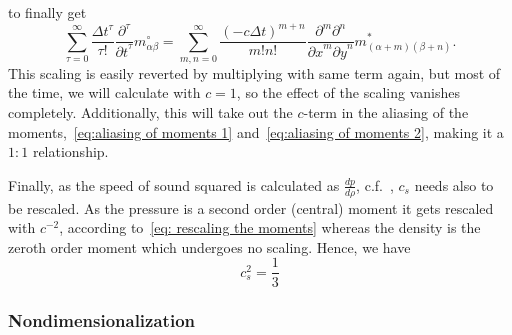 to finally get
\begin{equation}
  \label{eq: Taylor of moments}
  \sum_{\tau = 0}^\infty \frac{{\Delta t}^\tau }{\tau!} \frac{\partial^\tau}{{\partial t}^\tau} m_{\alpha\beta}^{\circ} =
 \sum_{m,n = 0}^\infty \frac{{(- c\Delta t)}^{m+n}} {m!n!} \frac{\partial^m \partial^n}{ {\partial x}^m{\partial y}^n} m^*_{(\alpha + m)(\beta + n)}.
\end{equation}
This scaling is easily reverted by multiplying with same term again, but most of the time, we will calculate with $c=1$, so the effect of the scaling vanishes completely.
Additionally, this will take out the $c$-term in the aliasing of the moments,~\eqref{eq:aliasing of moments 1} and~\eqref{eq:aliasing of moments 2}, making it a $1:1$ relationship.

Finally, as the speed of sound squared is calculated as $\frac{dp}{d\rho}$, c.f.~\cite[page 175]{wolf2000lattice}, $c_s$ needs also to be rescaled.
As the pressure is a second order (central) moment it gets rescaled with $c^{-2}$, according to~\eqref{eq: rescaling the moments} whereas the density is the zeroth order moment which undergoes no scaling.
Hence, we have
\begin{equation}
   c_s^2 = \frac{1}{3}
\end{equation}

\subsubsection{Nondimensionalization}
\label{subs:Nondimensionalization}

